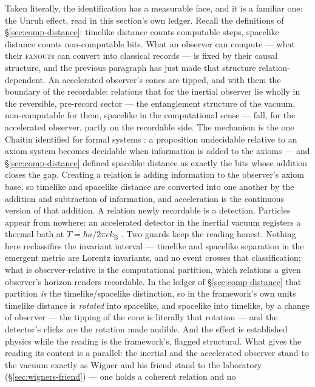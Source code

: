 Taken literally, the identification has a measurable face, and it is a familiar one: the Unruh
effect, read in this section's own ledger. Recall the definitions of \S\ref{sec:comp-distance}:
timelike distance counts computable steps, spacelike distance counts non-computable bits. What an
observer can compute --- what their \textsc{fanout}s can convert into classical records --- is fixed
by their causal structure, and the previous paragraph has just made that structure
relation-dependent. An accelerated observer's cones are tipped, and with them the boundary of the
recordable: relations that for the inertial observer lie wholly in the reversible, pre-record sector
--- the entanglement structure of the vacuum, non-computable for them, spacelike in the
computational sense --- fall, for the accelerated observer, partly on the recordable side. The mechanism is the one
Chaitin identified for formal systems \autocite{Chaitin1998}: a proposition undecidable relative to
an axiom system becomes decidable when information is added to the axioms --- and
\S\ref{sec:comp-distance} defined spacelike distance as exactly the bits whose addition closes the
gap. Creating a relation is adding information to the observer's axiom base, so timelike and
spacelike distance are converted into one another by the addition and subtraction of information,
and acceleration is the continuous version of that addition. A
relation newly recordable is a detection. Particles appear from nowhere: an accelerated detector in
the inertial vacuum registers a thermal bath at $T = \hbar a / 2\pi c k_{\mathrm{B}}$
\autocite{unruh1976notes}. Two guards keep the reading honest. Nothing here reclassifies the
invariant interval --- timelike and spacelike separation in the emergent metric are Lorentz
invariants, and no event crosses that classification; what is observer-relative is the computational
partition, which relations a given observer's horizon renders recordable. In the ledger of
\S\ref{sec:comp-distance} that partition \emph{is} the timelike/spacelike distinction, so in the
framework's own units timelike distance is \emph{rotated} into spacelike, and spacelike into
timelike, by a change of observer --- the tipping of the cone is literally that rotation --- and the
detector's clicks are the rotation made audible. And the effect is established physics
while the reading is the framework's, flagged structural. What gives the reading its content is a
parallel: the inertial and the accelerated observer stand to the vacuum exactly as Wigner and his
friend stand to the laboratory (\S\ref{sec:wigners-friend}) --- one holds a coherent relation and no
